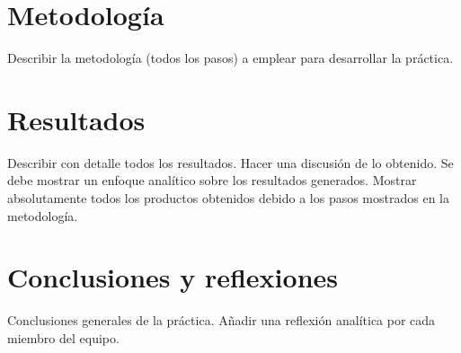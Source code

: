 \documentclass[sigconf]{acmart}
\begin{document}
\section{Metodolog{\'ia}}
Describir la metodolog{\'i}a (todos los pasos) a emplear para desarrollar la pr{\'a}ctica. 
\section{Resultados}
Describir con detalle todos los resultados. Hacer una discusi{\'o}n de lo obtenido. Se debe mostrar un enfoque anal{\'i}tico sobre los resultados generados. Mostrar absolutamente todos los productos obtenidos debido a los pasos mostrados en la metodolog{\'i}a.
\section{Conclusiones y reflexiones}
Conclusiones generales de la pr{\'a}ctica. A\~nadir una reflexi{\'o}n anal{\'i}tica por cada miembro del equipo.



\end{document}
